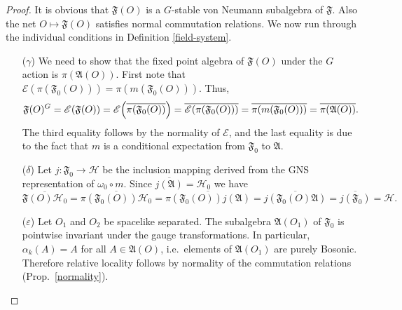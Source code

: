 \documentclass[11pt]{article}
\newcommand{\alg}[1]{\mathfrak{#1}}
\theoremstyle{definition}
\theoremstyle{definition}
\theoremstyle{remark}
\newcommand{\ve}{\varepsilon}
\def\2#1{{\mathcal #1}}
\def\4#1{{\mathscr #1}}
\def\al#1{{\mathfrak #1}}
\def\a{\alpha} \def\b{\beta} \def\g{\gamma} \def\d{\delta}
\def\om{\omega} \def\Om{\Omega} \def\dd{\partial} \def\D{\Delta}
\begin{document}
\begin{proof} It is obvious that $\al F(O)$ is a
  $G$-stable von Neumann subalgebra of $\al F$.  Also
  the net $O\mapsto \al F(O)$ satisfies normal
  commutation relations.  We now run through the
  individual conditions in Definition
  \ref{field-system}.

  \begin{enumerate}

  \item[($\g$)] We need to show that the fixed
    point algebra of $\al F(O)$ under the $G$ action is
    $\pi (\al A(O))$.  First note that $\4E (\pi (\al
    F_0(O)))=\pi (m(\al F_0(O)))$.  Thus,
\[ \al F(O)^{G}=\4E (\al F(O))=\4E \Bigl(\overline{\pi
  (\al F_0(O))}\Bigr)=\overline{\4E (\pi (\al
  F_0(O)))}= \overline{\pi (m(\al F_0(O)))
}=\overline{\pi (\al A(O))} .
\] The third equality follows by the normality of
$\4E$, and the last equality is due to the fact that
$m$ is a conditional expectation from $\al F_0$ to $\al
A$.


\item[($\d$)] Let $j:\al F_0\to \2H$ be the
  inclusion mapping derived from the GNS representation
  of $\om _0\circ m$.  Since $\overline{j(\alg{A})}=\2H
  _0$ we have
$$ \overline{\alg{F}(O)\2H _0}=\overline{\pi (\alg{F}_0(O))\2H
  _0}=\overline{\pi
  (\alg{F}_0(O))j(\alg{A})}=\overline{j(\alg{F}_0(O)\alg{A})}=\overline{j(\alg{F}_0)}=\2H
.$$

\item[($\ve$)] Let $O_1$ and $O_2$ be spacelike separated.  The
  subalgebra $\alg{A}(O _1)$ of $\alg{F}_0$ is pointwise invariant
  under the gauge transformations. In particular, $\a _k(A)=A$ for all
  $A\in \alg{A}(O)$, i.e.\ elements of $\alg{A}(O_1)$ are purely
  Bosonic.  Therefore relative locality follows by normality of the
  commutation relations (Prop.\ \ref{normality}).

\end{enumerate}


\end{proof}
\end{document}
